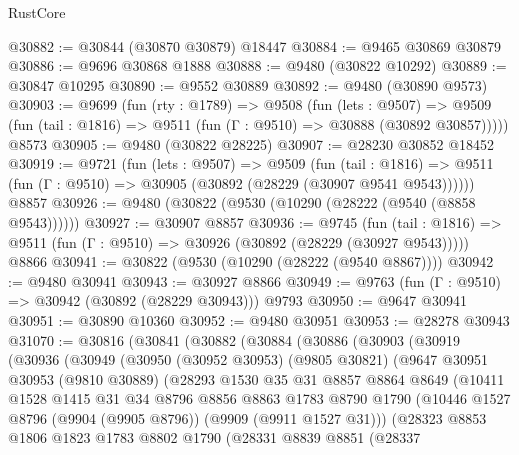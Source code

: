 \begin{lexlean}{RustCore}
\begin{coremodule}
@30882 := @30844 (@30870 @30879) @18447
@30884 := @9465 @30869 @30879
@30886 := @9696 @30868 @1888
@30888 := @9480 (@30822 @10292)
@30889 := @30847 @10295
@30890 := @9552 @30889
@30892 := @9480 (@30890 @9573)
@30903 := @9699
    (fun (rty : @1789) =>
    @9508
      (fun (lets : @9507) =>
      @9509 (fun (tail : @1816) => @9511 (fun (Γ : @9510) => @30888 (@30892 @30857)))))
    @8573
@30905 := @9480 (@30822 @28225)
@30907 := @28230 @30852 @18452
@30919 := @9721
    (fun (lets : @9507) =>
    @9509
      (fun (tail : @1816) =>
      @9511 (fun (Γ : @9510) => @30905 (@30892 (@28229 (@30907 @9541 @9543))))))
    @8857
@30926 := @9480 (@30822 (@9530 (@10290 (@28222 (@9540 (@8858 @9543))))))
@30927 := @30907 @8857
@30936 := @9745
    (fun (tail : @1816) => @9511 (fun (Γ : @9510) => @30926 (@30892 (@28229 (@30927 @9543)))))
    @8866
@30941 := @30822 (@9530 (@10290 (@28222 (@9540 @8867))))
@30942 := @9480 @30941
@30943 := @30927 @8866
@30949 := @9763 (fun (Γ : @9510) => @30942 (@30892 (@28229 @30943))) @9793
@30950 := @9647 @30941
@30951 := @30890 @10360
@30952 := @9480 @30951
@30953 := @28278 @30943
@31070 := @30816
    (@30841
      (@30882
        (@30884
          (@30886
            (@30903
              (@30919
                (@30936
                  (@30949
                    (@30950
                      (@30952 @30953)
                      (@9805 @30821)
                      (@9647
                        @30951
                        @30953
                        (@9810 @30889)
                        (@28293
                          @1530
                          @35
                          @31
                          @8857
                          @8864
                          @8649
                          (@10411
                            @1528
                            @1415
                            @31
                            @34
                            @8796
                            @8856
                            @8863
                            @1783
                            @8790
                            @1790
                            (@10446 @1527 @8796 (@9904 (@9905 @8796)) (@9909 (@9911 @1527 @31)))
                            (@28323
                              @8853
                              @1806
                              @1823
                              @1783
                              @8802
                              @1790
                              (@28331
                                @8839
                                @8851
                                (@28337

\end{coremodule}
\end{lexlean}
